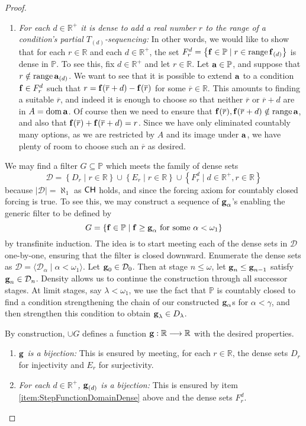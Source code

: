 \documentclass{amsart}
\theoremstyle{definition}
\theoremstyle{remark}
\renewcommand{\P}{\mathbb{P}}
\newcommand{\R}{\mathbb{R}}
\newcommand{\CH}{\textup{\textsf{CH}}}
\DeclareMathOperator{\ran}{range}
\DeclareMathOperator{\dom}{dom}
\newcommand{\st}{\; | \;}
\newcommand{\set}[2]{\left\{#1\st #2 \right\}}
\newcommand{\seq}[2]{\langle #1 \st #2 \rangle}
\newcommand{\To}{\longrightarrow}
\renewcommand{\a}{\textup{\textbf{a}}}
\newcommand{\g}{\textup{\textbf{g}}}
\newcommand{\f}{\textup{\textbf{f}}}
\renewcommand{\r}{\overline r}
\begin{document}
\begin{proof}
\begin{enumerate}
	\item \emph{For each $d \in \R^+$ it is dense to add a real number $r$ to the range of a condition's partial $T_{(d)}$-sequencing:} In other words, we would like to show that for each $r \in \R$ and each $d \in \R^+$, the set $F^d_r=\set{\f \in \P}{r \in \ran \f_{(d)}}$ is dense in $\P$. To see this, fix $d \in \R^+$ and let $r \in \R$. Let $\a \in \P$, and suppose that $r \notin \ran\a_{(d)}$. We want to see that it is possible to extend $\a$ to a condition $\f \in F^d_r$ such that $r=\f(\r+d)-\f(\r)$ for some $\r \in \R$. This amounts to finding a suitable $\r$, and indeed it is enough to choose so that neither $\r$ or $\r+d$ are in $A = \dom \a$. Of course then we need to ensure that $\f(\r), \f(\r+d) \notin \ran \a$, and also that $\f(\r)+\f(\r+d)=r$. Since we have only eliminated countably many options, as we are restricted by $A$ and its image under $\a$, we have plenty of room to choose such an $\r$ as desired.
\end{enumerate}

We may find a filter $G \subseteq \P$ which meets the family of dense sets $$\mathcal D = \set{D_r}{r\in \R} \cup \set{E_r}{r \in \R} \cup \set{F^d_r}{d \in \R^+, r \in \R}$$ because $|\mathcal D|=\aleph_1$ as $\CH$ holds, and since the forcing axiom for countably closed forcing is true. To see this, we may construct a sequence of $\g_\alpha$'s enabling the generic filter to be defined by $$G=\set{\f \in \P}{\f \geq \g_\alpha \text{ for some } \alpha<\omega_1}$$ by transfinite induction. The idea is to start meeting each of the dense sets in $\mathcal D$ one-by-one, ensuring that the filter is closed downward. Enumerate the dense sets as $\mathcal D = \seq{\mathcal D_\alpha}{\alpha<\omega_1}$. Let $\g_0 \in \mathcal D_0$. Then at stage $n \leq \omega$, let $\g_n \leq \g_{n-1}$ satisfy $\g_n \in \mathcal D_n$. Density allows us to continue the construction through all successor stages. At limit stages, say $\lambda <\omega_1$, we use the fact that $\P$ is countably closed to find a condition strengthening the chain of our constructed $\g_\alpha$s for $\alpha<\gamma$, and then strengthen this condition to obtain $\g_\lambda \in D_\lambda$.

By construction, $\cup G$ defines a function $\g: \R \To \R$ with the desired properties. \begin{enumerate}
	\item \emph{$\g$ is a bijection:} This is ensured by meeting, for each $r \in \R$, the dense sets $D_r$ for injectivity and $E_r$ for surjectivity.
	\item \emph{For each $d \in \R^+$, $\g_{(d)}$ is a bijection:} This is ensured by item \ref{item:StepFunctionDomainDense} above and the dense sets $F^d_r$.
\end{enumerate}
\end{proof}
					



%
\end{document}
